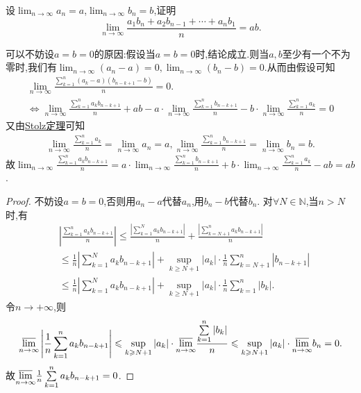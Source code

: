 \documentclass[../../main.tex]{subfiles}%
\begin{document}
\begin{proposition}\label{proposition:命题3.44}
设\(\lim_{n \to \infty} a_n = a\),\(\lim_{n \to \infty} b_n = b\),证明
\[
\lim_{n \to \infty} \frac{a_1 b_n + a_2 b_{n - 1} + \cdots + a_n b_1}{n} = ab.
\]
\end{proposition}
\begin{note}
可以不妨设$a=b=0$的原因:假设当$a=b=0$时,结论成立.则当$a,b$至少有一个不为零时,我们有$\lim_{n \to \infty} \left(a_n-a\right)=0,\lim_{n \to \infty} \left(b_n-b\right)=0$.从而由假设可知
\begin{gather*}
\lim_{n\rightarrow \infty} \frac{\sum\limits_{k=1}^n{\left( a_k-a \right) \left( b_{n-k+1}-b \right)}}{n}=0.
\\
\Leftrightarrow \lim_{n\rightarrow \infty} \frac{\sum\limits_{k=1}^n{a_kb_{n-k+1}}}{n}+ab-a\cdot \lim_{n\rightarrow \infty} \frac{\sum\limits_{k=1}^n{b_{n-k+1}}}{n}-b\cdot \lim_{n\rightarrow \infty} \frac{\sum\limits_{k=1}^n{a_k}}{n}=0
\end{gather*}
又由\hyperref[theorem:Stolz定理]{Stolz定理}可知
\begin{align*}
\lim_{n\rightarrow \infty} \frac{\sum\limits_{k=1}^n{a_k}}{n}=\lim_{n\rightarrow \infty} a_n=a,\lim_{n\rightarrow \infty} \frac{\sum\limits_{k=1}^n{b_{n-k+1}}}{n}=\lim_{n\rightarrow \infty} b_n=b.
\end{align*}
故$\lim_{n\rightarrow \infty} \frac{\sum\limits_{k=1}^n{a_kb_{n-k+1}}}{n}=a\cdot \lim_{n\rightarrow \infty} \frac{\sum\limits_{k=1}^n{b_{n-k+1}}}{n}+b\cdot \lim_{n\rightarrow \infty} \frac{\sum\limits_{k=1}^n{a_k}}{n}-ab=ab$.
\end{note}
\begin{proof}
不妨设$a=b=0$,否则用$a_n-a$代替$a_n$,用$b_n-b$代替$b_n$.
对$\forall N\in \mathbb{N}$,当$n>N$时,有
\begin{align*}
&\left|\frac{\sum\limits_{k = 1}^{n} a_k b_{n - k + 1}}{n}\right| \leqslant  \frac{\left|\sum\limits_{k = 1}^{N} a_k b_{n - k + 1}\right|}{n} + \frac{\left|\sum\limits_{k = N + 1}^{n} a_k b_{n - k + 1}\right|}{n}\\
&\leqslant  \frac{1}{n}\left|\sum\limits_{k = 1}^{N} a_k b_{n - k + 1}\right| + \sup_{k\geqslant  N + 1} |a_k| \cdot \frac{1}{n}\sum\limits_{k = N + 1}^{n} |b_{n - k + 1}|\\
&\leqslant  \frac{1}{n}\left|\sum\limits_{k = 1}^{N} a_k b_{n - k + 1}\right| + \sup_{k\geqslant  N + 1} |a_k| \cdot \frac{1}{n}\sum\limits_{k = 1}^{n} |b_k|.
\end{align*}
令$n\to+\infty$,则
\begin{align*}
\underset{n\rightarrow \infty}{{\varlimsup }}\left| \frac{1}{n}\sum\limits_{k=1}^n{a_kb_{n-k+1}} \right|\leqslant \mathop {\mathrm{sup}} \limits_{k\geqslant N+1}|a_k|\cdot \underset{n\rightarrow \infty}{{\varlimsup }}\frac{\sum\limits_{k=1}^n{\left| b_k \right|}}{n}\leqslant \mathop {\mathrm{sup}} \limits_{k\geqslant N+1}|a_k|\cdot \underset{n\rightarrow \infty}{{\varlimsup }}b_n=0.
\end{align*}
故$\underset{n\rightarrow \infty}{{\varlimsup }} \frac{1}{n}\sum\limits_{k=1}^n{a_kb_{n-k+1}} =0$.
\end{proof}
\end{document}
